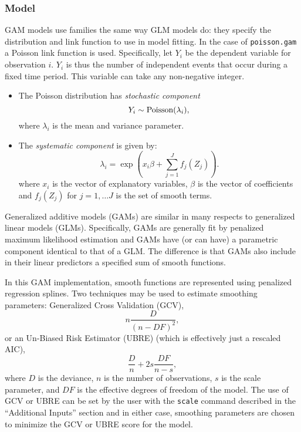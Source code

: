 \subsubsection{Model}


GAM models use families the same way GLM models do: they specify the distribution and link function to use in model fitting. In the case of {\tt poisson.gam} a Poisson link function is used. Specifically, let $Y_{i}$ be the dependent variable for observation $i$. $Y_i$ is thus the number of independent events that occur during a fixed time period. This variable can take any non-negative integer. 
\begin{itemize}
\item The Poisson distribution has \emph{stochastic component}  
\begin{equation*}
Y_{i}  \sim \text{Poisson} ( \lambda_{i}),\\
\end{equation*}
where $\lambda_{i}$ is the mean and variance parameter.
\item The \emph{systematic component} is given by:
\begin{equation*}
\lambda_i = \exp \left(x_i\beta + \sum_{j=1}^{J} f_j(Z_j) \right).
\end{equation*}
where $ x_i$ is the vector of explanatory variables, $\beta$ is the vector of coefficients and $f_j(Z_j)$ for $j=1, \ldots J$ is the set of smooth terms.
\end{itemize}

Generalized additive models (GAMs) are similar in many respects to generalized linear models (GLMs). Specifically, GAMs are generally fit by penalized maximum likelihood estimation and GAMs have (or can have) a parametric component identical to that of a GLM. The difference is that GAMs also include in their linear predictors a specified sum of smooth functions. 

In this GAM implementation, smooth functions are represented using penalized regression splines. Two techniques may be used to estimate smoothing parameters: Generalized Cross Validation (GCV),
\begin{equation}
n \frac{D}{(n-DF)^2},
\end{equation}
or an Un-Biased Risk Estimator (UBRE) (which is effectively just a rescaled AIC),
\begin{equation}
\frac{D}{n} + 2 s \frac{DF}{n-s},
\end{equation}
where $D$ is the deviance, $n$ is the number of observations, $s$ is the scale parameter, and $DF$ is the effective degrees of freedom of the model. The use of GCV or UBRE can be set by the user with the {\tt scale} command described in the ``Additional Inputs'' section and in either case, smoothing parameters are chosen to minimize the GCV or UBRE score for the model. 

